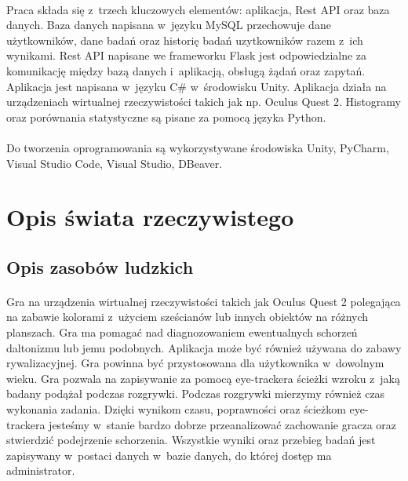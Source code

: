\documentclass[12pt, letterpaper]{article}
\begin{document}
\paragraph{}
Praca składa się z~trzech kluczowych elementów: aplikacja, Rest API oraz baza danych. Baza danych napisana w~języku MySQL przechowuje dane użytkowników, dane badań oraz historię badań uzytkowników razem z~ich wynikami. Rest API napisane we frameworku Flask jest odpowiedzialne za komunikację między bazą danych i~aplikacją, obsługą żądań oraz zapytań. Aplikacja jest napisana w~języku C# w~środowisku Unity. Aplikacja działa na urządzeniach wirtualnej rzeczywistości takich jak np. Oculus Quest 2. Histogramy oraz porównania statystyczne są pisane za pomocą języka Python.

\paragraph{}
Do tworzenia oprogramowania są wykorzystywane środowiska Unity, PyCharm, Visual Studio Code, Visual Studio, DBeaver.

\newpage

\section{Opis świata rzeczywistego}
\subsection{Opis zasobów ludzkich}
\paragraph{}
Gra na urządzenia wirtualnej rzeczywistości takich jak Oculus Quest 2 polegająca na zabawie kolorami z~użyciem sześcianów lub innych obiektów na różnych planszach. Gra ma pomagać nad diagnozowaniem ewentualnych schorzeń daltonizmu lub jemu podobnych. Aplikacja może być również używana do zabawy rywalizacyjnej. Gra powinna być przystosowana dla użytkownika w~dowolnym wieku. Gra pozwala na zapisywanie za pomocą eye-trackera ścieżki wzroku z~jaką badany podążał podczas rozgrywki. Podczas rozgrywki mierzymy również czas wykonania zadania. Dzięki wynikom czasu, poprawności oraz ścieżkom eye-trackera jesteśmy w~stanie bardzo dobrze przeanalizować zachowanie gracza oraz stwierdzić podejrzenie schorzenia. Wszystkie wyniki oraz przebieg badań jest zapisywany w~postaci danych w~bazie danych, do której dostęp ma administrator.
	
\end{document}
